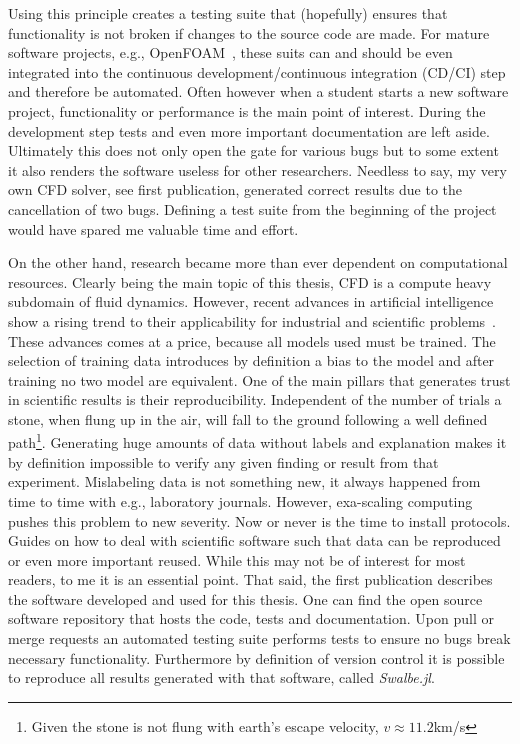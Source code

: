 Using this principle creates a testing suite that (hopefully) ensures that functionality is not broken if changes to the source code are made.
For mature software projects, e.g., OpenFOAM~\cite{jasakOpenFOAMLibraryComplex, jasakOpenFOAMOpenSource2009, chenOpenFOAMComputationalFluid2014}, these suits can and should be even integrated into the continuous development/continuous integration (CD/CI) step and therefore be automated.
Often however when a student starts a new software project, functionality or performance is the main point of interest.
During the development step tests and even more important documentation are left aside.
Ultimately this does not only open the gate for various bugs but to some extent it also renders the software useless for other researchers.
Needless to say, my very own CFD solver, see first publication, generated correct results due to the cancellation of two bugs.
Defining a test suite from the beginning of the project would have spared me valuable time and effort.

On the other hand, research became more than ever dependent on computational resources.
Clearly being the main topic of this thesis, CFD is a compute heavy subdomain of fluid dynamics. 
However, recent advances in artificial intelligence show a rising trend to their applicability for industrial and scientific problems~\cite{acemogluArtificialIntelligenceAutomation2018, beintemaControllingRayleighBenard2020}.
These advances comes at a price, because all models used must be trained.
The selection of training data introduces by definition a bias to the model and after training no two model are equivalent.
One of the main pillars that generates trust in scientific results is their reproducibility.
Independent of the number of trials a stone, when flung up in the air, will fall to the ground following a well defined path\footnote{Given the stone is not flung with earth's escape velocity, $v\approx 11.2$km/s}.
Generating huge amounts of data without labels and explanation makes it by definition impossible to verify any given finding or result from that experiment.
Mislabeling data is not something new, it always happened from time to time with e.g., laboratory journals.
However, exa-scaling computing pushes this problem to new severity.
Now or never is the time to install protocols. 
Guides on how to deal with scientific software such that data can be reproduced or even more important reused.
While this may not be of interest for most readers, to me it is an essential point.
That said, the first publication describes the software developed and used for this thesis. 
One can find the open source software repository that hosts the code, tests and documentation.
Upon pull or merge requests an automated testing suite performs tests to ensure no bugs break necessary functionality.
Furthermore by definition of version control it is possible to reproduce all results generated with that software, called \textit{Swalbe.jl}.

